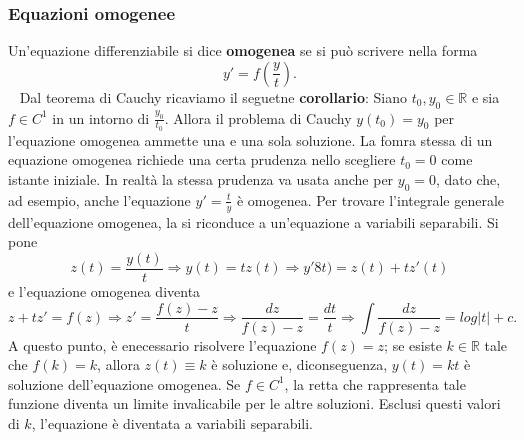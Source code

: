\subsubsection{Equazioni omogenee}
Un'equazione differenziabile si dice \textbf{omogenea} se si può scrivere nella forma
\[
    y'=f(\frac{y}{t}).
\]
\ \newline
Dal teorema di Cauchy ricaviamo il seguetne \textbf{corollario}:\newline
Siano $t_0, y_0 \in \mathbb{R}$ e sia $f \in C^1$ in un intorno di $\frac{y_0}{t_0}$. Allora il problema di Cauchy $y(t_0) = y_0$ per l'equazione omogenea ammette una e una sola soluzione.\newline
\newline
La fomra stessa di un equazione omogenea richiede una certa prudenza nello scegliere $t_0 = 0$ come istante iniziale. In realtà la stessa prudenza va usata anche per $y_0 = 0$, dato che, ad esempio, anche l'equazione $y'=\frac{t}{y}$ è omogenea.\newline
\newline
Per trovare l'integrale generale dell'equazione omogenea, la si riconduce a un'equazione a variabili separabili. Si pone
\[
    z(t) = \frac{y(t)}{t} \Rightarrow y(t) = t z(t) \Rightarrow y'8t) = z(t) + tz'(t)
\]
e l'equazione omogenea diventa
\[
    z + tz' = f(z) \Rightarrow  z' = \frac{f(z) -z}{t} \Rightarrow  \frac{dz}{f(z) - z} = \frac{dt}{t}
    \Rightarrow  \int \frac{dz}{f(z) -z} = log|t| + c.
\]
A questo punto, è enecessario risolvere l'equazione $f(z) = z$; se esiste $k \in \mathbb{R}$ tale che $f(k) = k$, allora $z(t) \equiv k$ è soluzione e, diconseguenza, $y(t) = kt$ è soluzione dell'equazione omogenea. Se $f \in C^1$, la retta che rappresenta tale funzione diventa un limite invalicabile per le altre soluzioni. Esclusi questi valori di $k$, l'equazione è diventata a variabili separabili.
